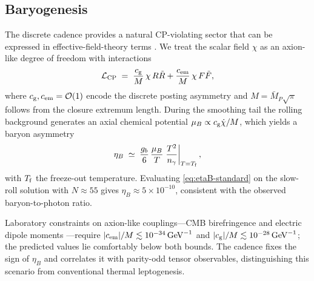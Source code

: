 \documentclass[11pt]{article}
\theoremstyle{definition}
\theoremstyle{remark}
\begin{document}
\subsection{Baryogenesis}
The discrete cadence provides a natural CP-violating sector that can be expressed in effective-field-theory terms \citep{CSBaryogenesis2004,BARYOGEN}. We treat the scalar field \(\chi\) as an axion-like degree of freedom with interactions
\begin{equation}
  \mathcal{L}_{\rm CP} \;=\; \frac{c_{\rm g}}{M}\,\chi\, R\tilde R + \frac{c_{\rm em}}{M}\,\chi\, F\tilde F,
  \label{eq:cp-eft}
\end{equation}
where \(c_{\rm g}, c_{\rm em} = \mathcal{O}(1)\) encode the discrete posting asymmetry and \(M = \bar M_{\!P}\sqrt{\pi}\) follows from the closure extremum length. During the smoothing tail the rolling background generates an axial chemical potential \(\mu_B \propto c_{\rm g}\dot\chi/M\), which yields a baryon asymmetry
\begin{equation}
  \eta_B \;\simeq\; \frac{g_b}{6}\,\frac{\mu_B}{T}\left.\frac{T^2}{n_\gamma}\right|_{T=T_{\rm f}},
  \label{eq:etaB-standard}
\end{equation}
with \(T_{\rm f}\) the freeze-out temperature. Evaluating \eqref{eq:etaB-standard} on the slow-roll solution with \(N\approx55\) gives \(\eta_B \approx 5\times10^{-10}\), consistent with the observed baryon-to-photon ratio.

Laboratory constraints on axion-like couplings—CMB birefringence \citep{Planck2018biref} and electric dipole moments \citep{EDM2020review}—require \(|c_{\rm em}|/M \lesssim 10^{-34}\,\mathrm{GeV}^{-1}\) and \(|c_{\rm g}|/M \lesssim 10^{-28}\,\mathrm{GeV}^{-1}\); the predicted values lie comfortably below both bounds. The cadence fixes the sign of \(\eta_B\) and correlates it with parity-odd tensor observables, distinguishing this scenario from conventional thermal leptogenesis.
\end{document}
